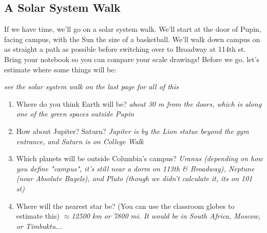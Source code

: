 \documentclass[12pt]{article}%
\begin{document}
\begin{flushleft}
\subsection{A Solar System Walk}

If we have time, we'll go on a solar system walk.  We'll start at the door of Pupin, facing campus, with the Sun the size of a basketball. We'll walk down campus on as straight a path as possible before switching over to Broadway at 114th st. Bring your notebook so you can compare your scale drawings! Before we go, let's estimate where some things will be:

{\it see the solar system walk on the last page for all of this}

\begin{enumerate}
\item Where do you think Earth will be? {\it about 30 m from the doors, which is along one of the green spaces outside Pupin}
\item How about Jupiter? Saturn? {\it Jupiter is by the Lion statue beyond the gym entrance, and Saturn is on College Walk}
\item Which planets will be outside Columbia's campus? {\it Uranus (depending on how you define "campus", it's still near a dorm on 113th \& Broadway), Neptune (near Absolute Bagels), and Pluto (though we didn't calculate it, its on 101 st)}
\item Where will the nearest star be? (You can use the classroom globes to estimate this) {\it $\approx$12500 km or 7800 mi. It would be in South Africa, Moscow, or Timbuktu...}
\end{enumerate}



\end{flushleft}
\end{document}
